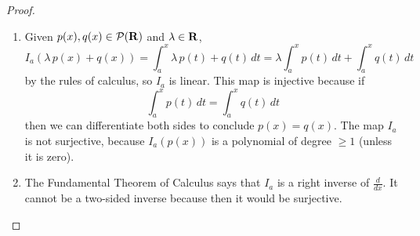 \documentclass[11pt]{amsart}
\begin{document}
\begin{enumerate}[(1)]
\begin{proof}
\begin{enumerate}
\item Given $p(x), q(x) \in \mathcal{P}(\mathbf{R})$ and $\lambda \in \mathbf{R}$,
\[
  I_a (\lambda \, p(x) + q(x)) = \int_a^x \lambda \, p(t) + q(t) \, dt = \lambda \int_a^x p(t) \, dt + \int_a^x q(t) \, dt
\]
by the rules of calculus, so $I_a$ is linear. This map is injective because if
\[
  \int_a^x p(t) \, dt = \int_a^x q(t) \, dt
\]
then we can differentiate both sides to conclude $p(x) = q(x)$.
The map $I_a$ is not surjective, because $I_a(p(x))$ is a polynomial of degree $\ge 1$ (unless it is zero).

\item The Fundamental Theorem of Calculus says that $I_a$ is a right inverse of $\frac{d}{dx}$. It cannot be a two-sided inverse because then it would be surjective. \qedhere

\end{enumerate}
\end{proof}

\end{enumerate}
\end{document}
